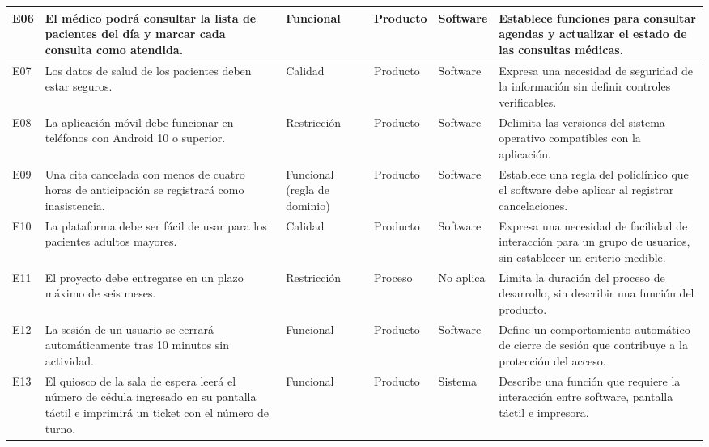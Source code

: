 \documentclass[12pt,a4paper]{article}
\begin{document}
\begin{landscape}
\begin{longtable}{
P{0.8cm}
P{8.6cm}
P{2.5cm}
P{1.6cm}
P{1.6cm}
P{9.0cm}
}
\midrule

E06 &
El médico podrá consultar la lista de
pacientes del día y marcar cada consulta
como atendida. &
Funcional &
Producto &
Software &
Establece funciones para consultar
agendas y actualizar el estado de
las consultas médicas.\\

\midrule

E07 &
Los datos de salud de los pacientes
deben estar seguros. &
Calidad &
Producto &
Software &
Expresa una necesidad de seguridad
de la información sin definir
controles verificables.\\

\midrule

E08 &
La aplicación móvil debe funcionar
en teléfonos con Android 10 o superior. &
Restricción &
Producto &
Software &
Delimita las versiones del sistema
operativo compatibles con la aplicación.\\

\midrule

E09 &
Una cita cancelada con menos de cuatro
horas de anticipación se registrará
como inasistencia. &
Funcional
(regla de dominio) &
Producto &
Software &
Establece una regla del policlínico
que el software debe aplicar al
registrar cancelaciones.\\

\midrule

E10 &
La plataforma debe ser fácil de usar
para los pacientes adultos mayores. &
Calidad &
Producto &
Software &
Expresa una necesidad de facilidad
de interacción para un grupo de usuarios,
sin establecer un criterio medible.\\

\midrule

E11 &
El proyecto debe entregarse en un
plazo máximo de seis meses. &
Restricción &
Proceso &
No aplica &
Limita la duración del proceso de
desarrollo, sin describir una función
del producto.\\

\midrule

E12 &
La sesión de un usuario se cerrará
automáticamente tras 10 minutos
sin actividad. &
Funcional &
Producto &
Software &
Define un comportamiento automático
de cierre de sesión que contribuye
a la protección del acceso.\\

\midrule

E13 &
El quiosco de la sala de espera leerá
el número de cédula ingresado en su
pantalla táctil e imprimirá un ticket
con el número de turno. &
Funcional &
Producto &
Sistema &
Describe una función que requiere
la interacción entre software,
pantalla táctil e impresora.\\


\end{longtable}
\end{landscape}
\end{document}
